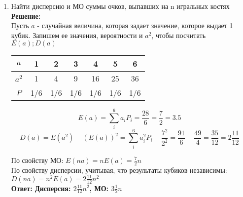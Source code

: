 \documentclass[a4paper,12pt]{article}
\begin{document}
\begin{enumerate}
\item Найти дисперсию и МО суммы очков, выпавших на n игральных костях\\
\textbf{Решение:}\\
Пусть $a$ - случайная величина, которая задает значение, которое выдает 1 кубик. Запишем ее значения, вероятности и $a^2$, чтобы посчитать $E(a); D(a)$
\begin{center}
 \begin{tabular}{|c| c| c| c|c|c|c|} 
 \hline
 $a$ & 1 & 2 & 3 & 4 & 5& 6\\ 
 \hline
  $a^2$ & 1 & 4 & 9 & 16 & 25& 36\\ 
 \hline
$P$ & 1/6 & 1/6 & 1/6 & 1/6 & 1/6& 1/6\\ 
\hline
\end{tabular}
\end{center}
$$E(a)=\sum_i^{6} {a_i P_i} = \frac{28}{6}=\frac{7}{2}=3.5$$
$$D(a)=E(a^2) - (E(a))^2=\sum_i^{6} {a^2_i P_i}-\frac{7^2}{2^2} = \frac{91}{6}-\frac{49}{4}=\frac{35}{12}=2\frac{11}{12}$$

По свойству МО: $E(n a) = nE(a) = \frac{7}{2}n$\\
По свойству дисперсии, учитывая, что результаты кубиков независимы:\\ $D(n a) = n^2E(a) = 2\frac{11}{12}n^2$\\
\textbf{Ответ: Дисперсия: $2\frac{11}{12}n^2$, МО: $3\frac{1}{2}n$}


\end{enumerate}
\end{document}
